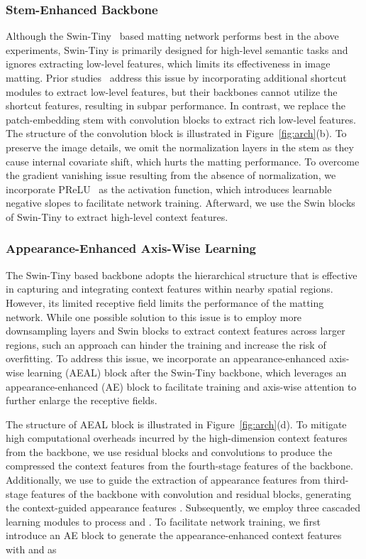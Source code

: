 \documentclass[10pt,twocolumn,letterpaper]{article}
\begin{document}
\subsubsection{Stem-Enhanced Backbone}
Although the Swin-Tiny~\cite{liu2021Swin} based matting network performs best in the above experiments, Swin-Tiny is primarily  designed for high-level semantic tasks and ignores extracting low-level features, which limits its effectiveness in image matting. 
Prior studies~\cite{park2022matteformer,dai2022boosting} address this issue by incorporating additional shortcut modules to extract low-level features, but their backbones cannot utilize the shortcut features, resulting in subpar performance. 
In contrast, we replace the patch-embedding stem with convolution blocks to extract rich low-level features.
The structure of the convolution block is illustrated in Figure~\ref{fig:arch}(b).
To preserve the image details, we omit the normalization layers in the stem as they cause internal covariate shift, which hurts the matting performance. 
To overcome the gradient vanishing issue resulting from the absence of normalization, we incorporate PReLU~\cite{he2015delving} as the activation function, which introduces learnable negative  slopes to facilitate network training.
Afterward, we use the Swin blocks of Swin-Tiny to extract high-level context features.


\subsubsection{Appearance-Enhanced Axis-Wise Learning}
The Swin-Tiny based backbone adopts the hierarchical structure that is effective in capturing and integrating context features within nearby spatial regions.
However, its limited receptive field limits the performance of the matting network. 
While one possible solution to this issue is to employ more downsampling layers and Swin blocks to extract context features across larger regions, such an approach can hinder the training and increase the risk of overfitting.
To address this issue, we incorporate an appearance-enhanced axis-wise learning  (AEAL) block after the Swin-Tiny backbone, which leverages an appearance-enhanced (AE) block to facilitate training and axis-wise attention to further enlarge the receptive fields.


The structure of AEAL block is illustrated in Figure~\ref{fig:arch}(d).
To mitigate high computational overheads incurred by the high-dimension context features from the backbone, we use residual blocks and  convolutions to produce the compressed the context features  from the fourth-stage features  of the backbone.
Additionally, we use  to guide the extraction of appearance features from third-stage features  of the backbone with convolution and residual blocks, generating the context-guided appearance features . 
Subsequently, we employ three cascaded learning modules to process  and . 
To facilitate network training, we first introduce an AE block to generate the appearance-enhanced context features  with  and  as 
\end{document}
